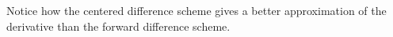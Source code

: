 \begin{example}
Notice how the centered difference scheme gives a better approximation of the 
derivative than the forward difference scheme.
\end{example}





